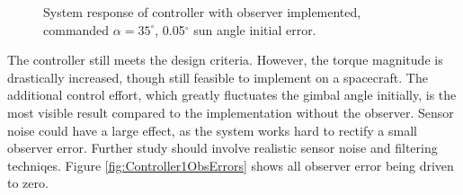\documentclass[]{aiaa-tc}%
\begin{document}
	\begin{figure}[H]
		\centering
		\caption{System response of controller with observer implemented, commanded $\alpha=35^{\circ}$, 0.05$^{\circ}$ sun angle initial error. }
		\label{fig:Controller1Obs}
	\end{figure}	

	The controller still meets the design criteria. However, the torque magnitude is drastically increased, though still feasible to implement on a spacecraft. The additional control effort, which greatly fluctuates the gimbal angle initially, is the most visible result compared to the implementation without the observer. Sensor noise could have a large effect, as the system works hard to rectify a small observer error. Further study should involve realistic sensor noise and filtering techniqes. Figure \ref{fig:Controller1ObsErrors} shows all observer error being driven to zero.
\end{document}
